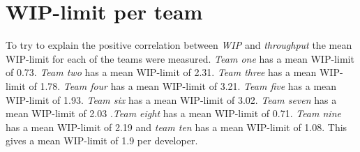 \documentclass[UKenglish]{ifimaster}  %
\begin{document}
\section{WIP-limit per team}
\label{sec:WIP:limit}
\vspace{-1em}
To try to explain the positive correlation between \textit{WIP} and \textit{throughput} the mean WIP-limit for each of the teams were measured.  \textit{Team one} has a mean WIP-limit of 0.73. \textit{Team two} has a mean WIP-limit of 2.31. \textit{Team three} has a mean WIP-limit of 1.78. \textit{Team four} has a mean WIP-limit of 3.21. \textit{Team five} has a mean WIP-limit of 1.93. \textit{Team six} has a mean WIP-limit of 3.02. \textit{Team seven} has a mean WIP-limit of 2.03 .\textit{Team eight} has a mean WIP-limit of 0.71. \textit{Team nine} has a mean WIP-limit of 2.19 and \textit{team ten} has a mean WIP-limit of 1.08. This gives a mean WIP-limit of 1.9 per developer. 
\end{document}
